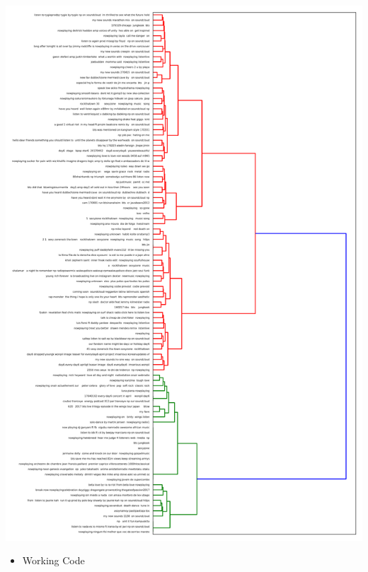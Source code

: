 \documentclass[10pt]{article}
\begin{document}
\includegraphics[scale=0.5]{clusters.png}

\begin{itemize}
	\item Working Code
\end{itemize}
\end{document}
